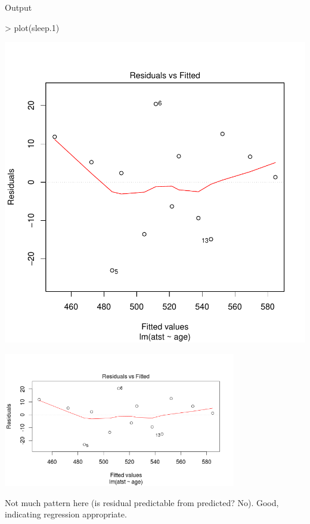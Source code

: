\documentclass{beamer}
\begin{document}
\begin{frame}[fragile]{Output}

\begin{Schunk}
\begin{Sinput}
> plot(sleep.1)
\end{Sinput}
\end{Schunk}
\includegraphics{Regression-007}


\includegraphics[width=4in]{sleep-resid}

Not much pattern here (is residual predictable from predicted? No). Good, indicating regression appropriate.
  
\end{frame}
\end{document}
